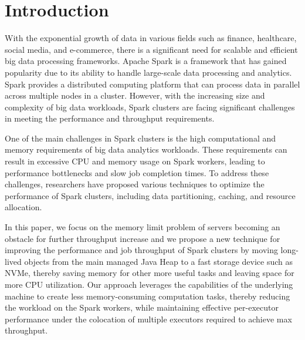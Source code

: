 \section{Introduction}
\label{sec:intro}

With the exponential growth of data in various fields such as finance,
healthcare, social media, and e-commerce, there is a significant need
for scalable and efficient big data processing frameworks. 
Apache
Spark \cite{Spark} is a framework that has gained popularity
due to its ability to handle large-scale data processing and
analytics. Spark provides a distributed computing platform that can
process data in parallel across multiple nodes in a cluster. However,
with the increasing size and complexity of big data workloads, Spark
clusters are facing significant challenges in meeting the performance
and throughput requirements. 

One of the main challenges in Spark clusters  is the high computational
and memory requirements of big data analytics workloads.  These
requirements can result in excessive CPU and memory usage on Spark
workers, leading to performance bottlenecks and slow job completion
times. To address these challenges, researchers have proposed various
techniques  to optimize the performance of Spark clusters, including
data partitioning, caching, and resource allocation.

In this paper, we focus on the memory limit problem of servers
becoming an obstacle for further throughput increase and we propose a
new technique  for improving the performance and job throughput of
Spark clusters by moving long-lived objects from the main managed Java
Heap to a fast storage device such as NVMe, thereby saving memory for
other more useful tasks and leaving space for more CPU utilization.
Our approach leverages the capabilities of the underlying machine to
create less memory-consuming computation tasks, thereby reducing the
workload on the Spark workers, while maintaining effective
per-executor performance under the colocation of multiple executors
required to achieve max throughput. 


